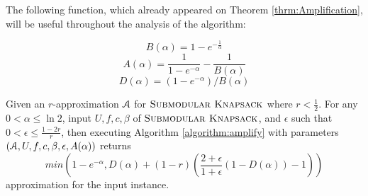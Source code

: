 \documentclass[a4paper,UKenglish,cleveref, autoref]{lipics-v2019}
\newcommand{\SK}{{\textsc{Submodular Knapsack}}\xspace}
\begin{document}
The following function, which already appeared on Theorem \ref{thrm:Amplification}, will be useful throughout the analysis of the algorithm:

$$ B(\alpha)=1-e^{-\frac{1}{\alpha}}$$
$$ A(\alpha) = \frac{1}{1-e^{-\alpha}}-\frac{1}{B(\alpha)}$$
 $$D(\alpha)=(1-e^{-\alpha})/B(\alpha)$$

 \begin{lemma}
 	\label{lemma:amplification}
 	Given an $r$-approximation $\mathcal{A}$ for $\SK$ where $r<\frac{1}{2}$.
 	For any $0< \alpha \leq  \ln 2$, input $U,f,c,\beta$ of $\SK$,
 	and $\epsilon$ such that $0<\epsilon\leq \frac{1-2r}{r}$, then executing
 	Algorithm \ref{algorithm:amplify}  with parameters
 	$(\mathcal{A}, U, f, c, \beta, \epsilon, A(\alpha))$ returns
 	$$min\left(1-e^{-\alpha}, D(\alpha) + (1-r) \left( \frac{2+\epsilon}{1+\epsilon}(1- D(\alpha)) -1 \right) \right)$$
 	approximation for the input instance.
 \end{lemma}
\end{document}
